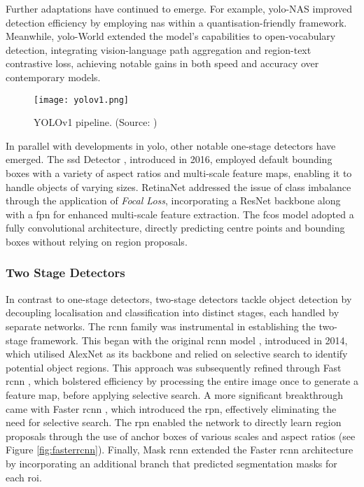 Further adaptations have continued to emerge. For example, \gls{yolo}-NAS \cite{yolonas} improved detection efficiency by employing \gls{nas} within a quantisation-friendly framework. Meanwhile, \gls{yolo}-World \cite{yoloworld} extended the model’s capabilities to open-vocabulary detection, integrating vision-language path aggregation and region-text contrastive loss, achieving notable gains in both speed and accuracy over contemporary models.

\begin{figure}[ht]
    \centering
    \texttt{[image: yolov1.png]}
    \caption{YOLOv1 pipeline. (Source: \cite{yolo})}
    \label{fig:yolov1}
\end{figure}

In parallel with developments in \gls{yolo}, other notable one-stage detectors have emerged. The \gls{ssd} Detector \cite{ssd}, introduced in 2016, employed default bounding boxes with a variety of aspect ratios and multi-scale feature maps, enabling it to handle objects of varying sizes. RetinaNet \cite{retinanet} addressed the issue of class imbalance through the application of \textit{Focal Loss}, incorporating a ResNet backbone along with a \gls{fpn} \cite{fpn} for enhanced multi-scale feature extraction. The \gls{fcos} model  \cite{fcos} adopted a fully convolutional architecture, directly predicting centre points and bounding boxes without relying on region proposals.

\subsubsection{Two Stage Detectors}
\label{subsubsec:2_twostage}

In contrast to one-stage detectors, two-stage detectors tackle object detection by decoupling localisation and classification into distinct stages, each handled by separate networks.
The \gls{rcnn} family was instrumental in establishing the two-stage framework. This began with the original \gls{rcnn} model \cite{rcnn}, introduced in 2014, which utilised AlexNet \cite{alexnet} as its backbone and relied on selective search to identify potential object regions. This approach was subsequently refined through Fast \gls{rcnn} \cite{fastrcnn}, which bolstered efficiency by processing the entire image once to generate a feature map, before applying selective search. A more significant breakthrough came with Faster \gls{rcnn} \cite{fasterrcnn}, which introduced the \gls{rpn}, effectively eliminating the need for selective search. The \gls{rpn} enabled the network to directly learn region proposals through the use of anchor boxes of various scales and aspect ratios (see Figure \ref{fig:fasterrcnn}). Finally, Mask \gls{rcnn} \cite{maskrcnn} extended the Faster \gls{rcnn} architecture by incorporating an additional branch that predicted segmentation masks for each \gls{roi}.

